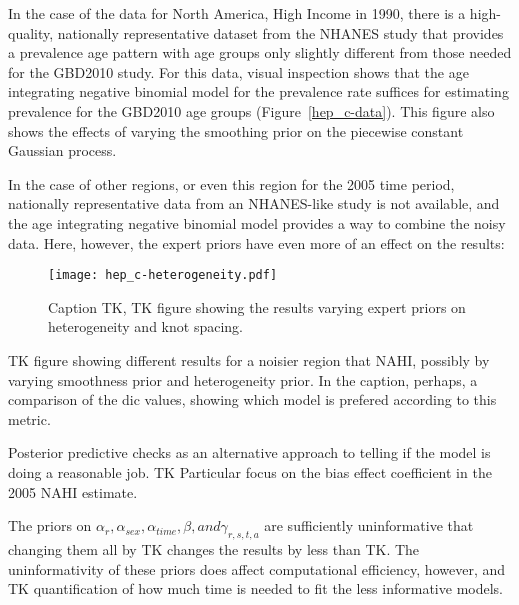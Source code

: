 In the case of the data for North America, High Income in 1990, there is a
high-quality, nationally representative dataset from the NHANES study
that provides a prevalence age pattern with age groups only slightly
different from those needed for the GBD2010 study.  For this data,
visual inspection shows that the age integrating negative binomial
model for the prevalence rate suffices for estimating prevalence for
the GBD2010 age groups (Figure~\ref{hep_c-data}).  
This figure also shows the effects of varying the smoothing prior on
the piecewise constant Gaussian process.

In the case of other regions, or even this region for the 2005 time period, nationally representative data
from an NHANES-like study is not available, and the age integrating negative binomial model provides a way
to combine the noisy data.  Here, however, the expert priors have even
more of an effect on the results:
\begin{figure}
\begin{center}
\texttt{[image: hep\_c-heterogeneity.pdf]}
\end{center}
\caption{Caption TK, TK figure showing the results varying expert priors on heterogeneity and knot spacing.
}
\label{hep_c-heterogeneity}
\end{figure}

TK figure showing different results for a noisier region that NAHI,
possibly by varying smoothness prior and heterogeneity prior.  In the
caption, perhaps, a comparison of the dic values, showing which model
is prefered according to this metric.

Posterior predictive checks as an alternative approach to telling if
the model is doing a reasonable job.  TK Particular focus on the bias
effect coefficient in the 2005 NAHI estimate.

The priors on $\alpha_{r}, \alpha_{sex}, \alpha_{time}, \beta, and
\gamma_{r,s,t,a}$ are sufficiently uninformative that changing them
all by TK changes the results by less than TK.  The uninformativity of
these priors does affect computational efficiency, however, and TK
quantification of how much time is needed to fit the less informative
models.
